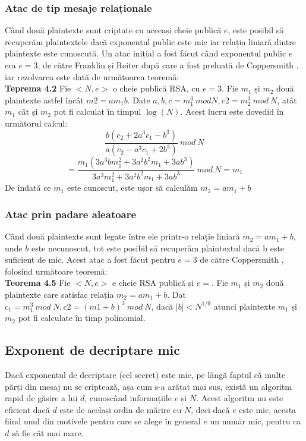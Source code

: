 \documentclass[12pt, oneside]{book}
\begin{document}
\subsubsection{Atac de tip mesaje relaționale}
Când două plaintexte sunt criptate cu aceeași cheie publică $e$, este posibil să recuperăm plaintextele dacă exponentul public este mic iar relația liniară dintre plaintexte este cunoscută. Un atac inițial a fost făcut când exponentul public $e$ era $e=3$, de către  Franklin și Reiter \cite{franklyn} după care a fost preluată de Coppersmith \cite{copper3}, iar rezolvarea este dată de următoarea teoremă: \\
\textbf{Teprema 4.2} Fie $<N,e>$ o cheie publică RSA, cu $e=3$. Fie $m_1$ și $m_2$ două plaintexte astfel încât $m2=am_1b$. Date $a,b,c=m_1^{3} \ mod N,c2 = m_2^3 \ mod \ N$, atât $m_1$ cât și $m_2$ pot fi calculat în timpul $\log(N)$. Acest lucru este dovedid în următorul calcul:
$$ \frac{b(c_2 + 2a^3c_1 - b^3)}{a(c_2-a^3c_1+2b^3)} \ mod \ N$$ 
$$= \frac{m_1(3a^3bm_1^2+3a^2b^2m_1+3ab^3)}{3a^3m_{1}^{2}+3a^2b^2m_1+3ab^3} \ mod \ N = m_1$$ 
De îndată ce $m_1$ este cunoscut, este ușor să calculăm $m_2 = am_1 +b$

\subsubsection{Atac prin padare aleatoare}
Când două plaintexte sunt legate între ele printr-o relație liniară $m_2=am_1+b$, unde $b$ este necunoscut, tot este posibil să recuperăm plaintextul dacă b este suficient de mic. Acest atac a fost făcut pentru $e=3$ de către Coppersmith \cite{cooper2}, folosind următoare teoremă:\\
\textbf{Teorema 4.5} Fie $<N,e>$ e cheie RSA publică și $e=$. Fie $m_1$ și $m_2$ două plaintexte care satisfac relația $m_2=am_1+b$. Dat $c_1=m_1^3 \ mod \ N,c2=(m1+b)^3 \ mod \ N$, dacă $|b|<N^{1/9}$ atunci plaintexte $m_1$ și $m_2$ pot fi calculate în timp polinomial.

\subsection{Exponent de decriptare mic}
Dacă exponentul de decriptare (cel secret) este mic, pe lângă faptul că multe părți din mesaj nu se criptează, așa cum s-a arătat mai sus, există un algoritm rapid de găsire a lui $d$, cunoscând informațiile $e$ și $N$. Acest algoritm nu este eficient dacă $d$ este de același ordin de mărire cu $N$, deci dacă $e$ este mic, acesta fiind unul din motivele pentru care se alege în general $e$ un număr mic, pentru ca $d$ să fie cât mai mare.
\end{document}
